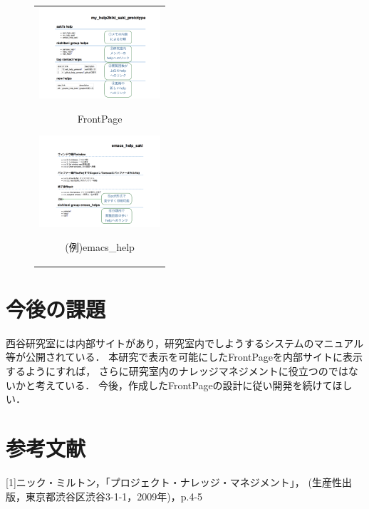 \documentclass[10pt,a4j,twocolumn]{jsarticle}
\begin{document}
\begin{figure}[htbp]
\begin{center}
\begin{tabular}{c}
\begin{minipage}{0.5\hsize}
\begin{center}
\includegraphics[width=4.5cm,bb=100 100 1000 1000]{my_help2hiki_saki.014.png}
\end{center}
\hspace{1cm} FrontPage

\end{minipage}
\begin{minipage}{0.5\hsize}
\begin{center}
\includegraphics[width=4.5cm,bb=100 100 1000 1000]{my_help2hiki_saki.015.png}
\end{center}
\hspace{1cm} (例)emacs\_help

\end{minipage}
\end{tabular}
\end{center}
\end{figure}

\section{今後の課題}
西谷研究室には内部サイトがあり，研究室内でしようするシステムのマニュアル等が公開されている．
本研究で表示を可能にしたFrontPageを内部サイトに表示するようにすれば，
さらに研究室内のナレッジマネジメントに役立つのではないかと考えている．
今後，作成したFrontPageの設計に従い開発を続けてほしい．

\section{参考文献}
[1]ニック・ミルトン，「プロジェクト・ナレッジ・マネジメント」，
(生産性出版，東京都渋谷区渋谷3-1-1，2009年)，p.4-5
\end{document}
